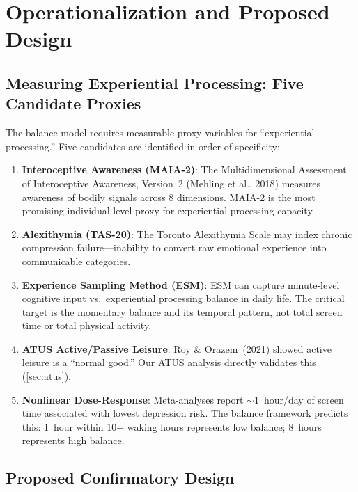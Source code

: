 \documentclass[a4paper,11pt,titlepage]{article}
\begin{document}
\section{Operationalization and Proposed Design}\label{sec:operationalization}

\subsection{Measuring Experiential Processing: Five Candidate Proxies}

The balance model requires measurable proxy variables for ``experiential processing.'' Five candidates are identified in order of specificity:

\begin{enumerate}
  \item \textbf{Interoceptive Awareness (MAIA-2)}: The Multidimensional Assessment of Interoceptive Awareness, Version~2 (Mehling et al., 2018) measures awareness of bodily signals across 8 dimensions. MAIA-2 is the most promising individual-level proxy for experiential processing capacity.
  \item \textbf{Alexithymia (TAS-20)}: The Toronto Alexithymia Scale may index chronic compression failure---inability to convert raw emotional experience into communicable categories.
  \item \textbf{Experience Sampling Method (ESM)}: ESM can capture minute-level cognitive input vs.\ experiential processing balance in daily life. The critical target is the momentary balance and its temporal pattern, not total screen time or total physical activity.
  \item \textbf{ATUS Active/Passive Leisure}: Roy \& Orazem~(2021) showed active leisure is a ``normal good.'' Our ATUS analysis directly validates this (\cref{sec:atus}).
  \item \textbf{Nonlinear Dose-Response}: Meta-analyses report $\sim$1~hour/day of screen time associated with lowest depression risk. The balance framework predicts this: 1~hour within 10+ waking hours represents low balance; 8~hours represents high balance.
\end{enumerate}


\subsection{Proposed Confirmatory Design}
\end{document}
